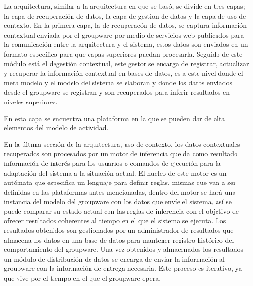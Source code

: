 La arquitectura, similar a la arquitectura en que se bas\'o, se divide en tres capas; la capa de recuperaci\'on de datos, la capa de gestion de datos y la capa de uso de contexto. En la primera capa, la de recuperac\'on de datos, se captura informaci\'on contextual enviada por el groupware por medio de servicios web publicados para la comunicaci\'on entre la arquitectura y el sistema, estos datos son enviados en un formato espec\'ifico para que capas superiores puedan procesarla. Seguido de este m\'odulo est\'a el degesti\'on contextual, este gestor se encarga de registrar, actualizar y recuperar la informaci\'on contextual en bases de datos, es a este nivel donde el meta modelo y el modelo del sistema se elaboran y donde los datos enviados desde el groupware se registran y son recuperados para inferir resultados en niveles superiores.

En esta capa se encuentra una plataforma en la que se pueden dar de alta elementos del modelo de actividad.

En la \'ultima secci\'on de la arquitectura, uso de contexto, los datos contextuales recuperados son procesados por un motor de inferencia que da como resultado informaci\'on de inter\'es para los usuarios o comandos de ejecuci\'on para la adaptaci\'on del sistema a la situaci\'on actual. El nucleo de este motor es un aut\'omata que especifica un lenguaje para definir reglas, mismas que van a ser definidas en las plataformas antes mencionadas, dentro del motor se har\'a una instancia del modelo del groupware con los datos que env\'ie el sistema, as\'i se puede comparar su estado actual con las reglas de inferencia con el objetivo de ofrecer resultados coherentes al tiempo en el que el sistema se ejecuta. Los resultados obtenidos son gestionados por un administrador de resultados que almacena los datos en una base de datos para mantener registro hist\'orico del comportamiento del groupware. Una vez obtenidos y almacenados los resultados un m\'odulo de distribuci\'on de datos se encarga de enviar la informaci\'on al groupware con la informaci\'on de entrega necesaria. Este proceso es iterativo, ya que vive por el tiempo en el que el groupware opera.